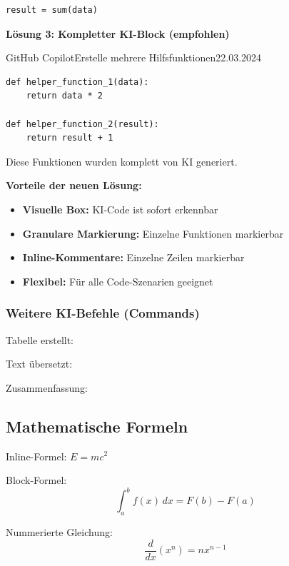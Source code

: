 \documentclass[../main.tex]{subfiles}
\begin{document}
\begin{verbatim}
result = sum(data)
\end{verbatim}

\textbf{Lösung 3: Kompletter KI-Block (empfohlen)}
\begin{aicode}{GitHub Copilot}{Erstelle mehrere Hilfsfunktionen}{22.03.2024}
\begin{verbatim}
def helper_function_1(data):
    return data * 2

def helper_function_2(result):
    return result + 1
\end{verbatim}
Diese Funktionen wurden komplett von KI generiert.
\end{aicode}

\textbf{Vorteile der neuen Lösung:}
\begin{itemize}
    \item \textbf{Visuelle Box:} KI-Code ist sofort erkennbar
    \item \textbf{Granulare Markierung:} Einzelne Funktionen markierbar
    \item \textbf{Inline-Kommentare:} Einzelne Zeilen markierbar
    \item \textbf{Flexibel:} Für alle Code-Szenarien geeignet
\end{itemize}

\subsubsection{Weitere KI-Befehle (Commands)}
Tabelle erstellt: 

Text übersetzt: 

Zusammenfassung: 


\subsection{Mathematische Formeln}

Inline-Formel: $E = mc^2$

Block-Formel:
$$\int_{a}^{b} f(x) \, dx = F(b) - F(a)$$

Nummerierte Gleichung:
\begin{equation}
    \frac{d}{dx}(x^n) = nx^{n-1}
    \label{eq:power_rule}
\end{equation}
\end{document}
